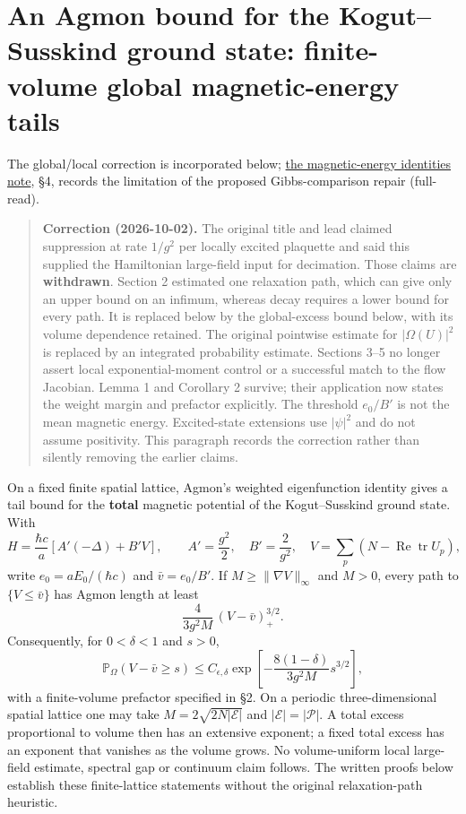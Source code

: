 \documentclass[11pt,a4paper]{article}
\begin{document}
\hypertarget{an-agmon-bound-for-the-kogutsusskind-ground-state-finite-volume-global-magnetic-energy-tails}{%
\section{An Agmon bound for the Kogut--Susskind ground state:
finite-volume global magnetic-energy
tails}\label{an-agmon-bound-for-the-kogutsusskind-ground-state-finite-volume-global-magnetic-energy-tails}}

The global/local correction is incorporated below;
\href{magnetic-energy-identities.md}{the magnetic-energy identities
note}, §4, records the limitation of the proposed Gibbs-comparison
repair (full-read).

\begin{quote}
\textbf{Correction (2026-10-02).} The original title and lead claimed
suppression at rate \(1/g^2\) per locally excited plaquette and said
this supplied the Hamiltonian large-field input for decimation. Those
claims are \textbf{withdrawn}. Section 2 estimated one relaxation path,
which can give only an upper bound on an infimum, whereas decay requires
a lower bound for every path. It is replaced below by the global-excess
bound below, with its volume dependence retained. The original pointwise
estimate for \(|\Omega(U)|^2\) is replaced by an integrated probability
estimate. Sections 3--5 no longer assert local exponential-moment
control or a successful match to the flow Jacobian. Lemma 1 and
Corollary 2 survive; their application now states the weight margin and
prefactor explicitly. The threshold \(e_0/B'\) is not the mean magnetic
energy. Excited-state extensions use \(|\psi|^2\) and do not assume
positivity. This paragraph records the correction rather than silently
removing the earlier claims.
\end{quote}

On a fixed finite spatial lattice, Agmon's weighted eigenfunction
identity gives a tail bound for the \textbf{total} magnetic potential of
the Kogut--Susskind ground state. With
\[H=\frac{\hbar c}{a}\left[A'(-\Delta)+B'V\right],\qquad
A'=\frac{g^2}{2},\quad B'=\frac{2}{g^2},\quad
V=\sum_p\left(N-\operatorname{Re}\operatorname{tr}U_p\right),\] write
\(e_0=aE_0/(\hbar c)\) and \(\bar v=e_0/B'\). If
\(M\ge\|\nabla V\|_\infty\) and \(M>0\), every path to
\(\{V\le\bar v\}\) has Agmon length at least
\[\frac{4}{3g^2M}\,(V-\bar v)_+^{3/2}.\] Consequently, for
\(0<\delta<1\) and \(s>0\), \[\mathbb P_\Omega(V-\bar v\ge s)
\le C_{\epsilon,\delta}\exp\left[-\frac{8(1-\delta)}{3g^2M}s^{3/2}\right],\]
with a finite-volume prefactor specified in §2. On a periodic
three-dimensional spatial lattice one may take
\(M=2\sqrt{2N|\mathcal E|}\) and \(|\mathcal E|=|\mathcal P|\). A total
excess proportional to volume then has an extensive exponent; a fixed
total excess has an exponent that vanishes as the volume grows. No
volume-uniform local large-field estimate, spectral gap or continuum
claim follows. The written proofs below establish these finite-lattice
statements without the original relaxation-path heuristic.
\end{document}
